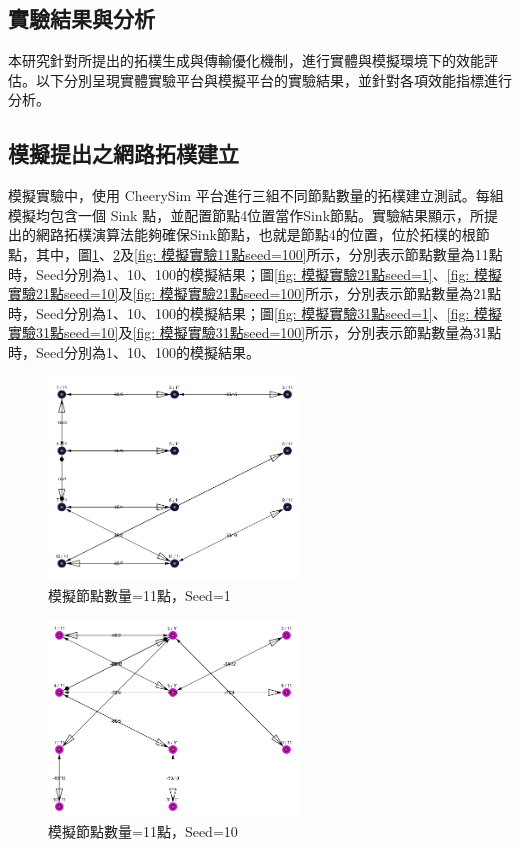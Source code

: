 \begin{ZhChapter}
\section{實驗結果與分析}
本研究針對所提出的拓樸生成與傳輸優化機制，進行實體與模擬環境下的效能評估。以下分別呈現實體實驗平台與模擬平台的實驗結果，並針對各項效能指標進行分析。

\subsection{模擬提出之網路拓樸建立}
模擬實驗中，使用 CheerySim 平台進行三組不同節點數量的拓樸建立測試。每組模擬均包含一個 Sink 點，並配置節點4位置當作Sink節點。實驗結果顯示，所提出的網路拓樸演算法能夠確保Sink節點，也就是節點4的位置，位於拓樸的根節點，其中，圖\ref{fig: 模擬實驗11點seed=1}、\ref{fig: 模擬實驗11點seed=10}及\ref{fig: 模擬實驗11點seed=100}所示，分別表示節點數量為11點時，Seed分別為1、10、100的模擬結果；圖\ref{fig: 模擬實驗21點seed=1}、\ref{fig: 模擬實驗21點seed=10}及\ref{fig: 模擬實驗21點seed=100}所示，分別表示節點數量為21點時，Seed分別為1、10、100的模擬結果；圖\ref{fig: 模擬實驗31點seed=1}、\ref{fig: 模擬實驗31點seed=10}及\ref{fig: 模擬實驗31點seed=100}所示，分別表示節點數量為31點時，Seed分別為1、10、100的模擬結果。

\begin{figure}[H]
    \centering
    \includegraphics[width = 0.6\textwidth]{image/模擬實驗11點seed=1.png}
    \caption{模擬節點數量=11點，Seed=1}
    \label{fig: 模擬實驗11點seed=1}
\end{figure}

\begin{figure}[H]
    \centering
    \includegraphics[width = 0.6\textwidth]{image/模擬實驗11點seed=10.png}
    \caption{模擬節點數量=11點，Seed=10}
    \label{fig: 模擬實驗11點seed=10}
\end{figure}


\end{ZhChapter}
